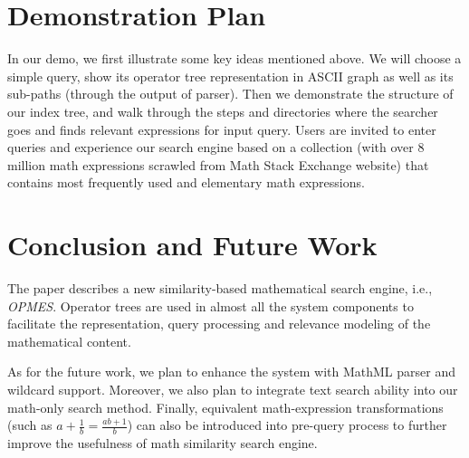 \documentclass{llncs}
\begin{document}
\section{Demonstration Plan}
In our demo, we first illustrate some key ideas mentioned above.
 We will choose a simple query, show its operator tree representation in ASCII graph as well as its sub-paths (through the output of parser).
 Then we demonstrate the structure of our index tree, and walk through the steps and directories where the searcher goes and finds relevant expressions for input query.
 Users are invited to enter queries and experience our search engine based on a collection (with over 8 million math expressions scrawled from Math Stack Exchange website) that contains most frequently used and elementary math expressions.

\section{Conclusion and Future Work}

The paper describes a new similarity-based mathematical search engine, i.e., {\em OPMES}. 
Operator trees are used in almost all the system components to facilitate 
the representation, query processing and relevance modeling of the mathematical content. 

As for the future work, we plan to enhance the system with 
MathML parser and wildcard support.  Moreover, we also plan to 
integrate text search ability into our math-only search method. 
Finally, equivalent math-expression transformations (such as $a+\frac 1 b = \frac{ab + 1}b$) can also be introduced into pre-query process to further improve the usefulness of math similarity search engine.



\end{document}
